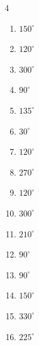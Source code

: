 \begin{multicols}{4}
\begin{enumerate}
  \item $\displaystyle 150^{\circ}$

  \item $\displaystyle 120^{\circ}$

  \item $\displaystyle 300^{\circ}$

  \item $\displaystyle 90^{\circ}$

  \item $\displaystyle 135^{\circ}$

  \item $\displaystyle 30^{\circ}$

  \item $\displaystyle 120^{\circ}$

  \item $\displaystyle 270^{\circ}$

  \item $\displaystyle 120^{\circ}$

  \item $\displaystyle 300^{\circ}$

  \item $\displaystyle 210^{\circ}$

  \item $\displaystyle 90^{\circ}$

  \item $\displaystyle 90^{\circ}$

  \item $\displaystyle 150^{\circ}$

  \item $\displaystyle 330^{\circ}$

  \item $\displaystyle 225^{\circ}$


\end{enumerate}
\end{multicols}
